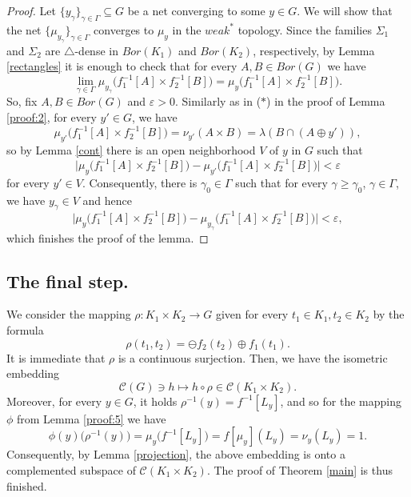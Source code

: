 \documentclass[12pt,fleqn]{amsart}
\numberwithin{equation}{section}
\theoremstyle{definition}
\def\B{\mathcal B}
\def\C{\mathcal C}
\def\ep{\varepsilon}
\newcommand{\cE}{\mathcal E}
\begin{document}
\begin{proof}
Let $\{y_\gamma\}_{\gamma\in\Gamma}\subseteq G$ be a net converging to some $y\in G$. We will show that the net $\{\mu_{y_\gamma}\}_{\gamma\in\Gamma}$ converges to $\mu_y$ in the $weak^\ast$ topology. Since the families $\Sigma_1$ and $\Sigma_2$ are $\bigtriangleup$-dense in $Bor(K_1)$ and $Bor(K_2)$, respectively, by Lemma \ref{rectangles} it is enough to check that for every $A,B\in Bor(G)$ we have
\[\lim_{\gamma\in\Gamma}\mu_{y_\gamma}\big(f_1^{-1}[A]\times f_2^{-1}[B]\big)=\mu_y\big(f_1^{-1}[A]\times f_2^{-1}[B]\big).\]
So, fix $A,B\in Bor(G)$ and $\ep>0$. Similarly as in ($*$) in the proof of Lemma \ref{proof:2}, for every $y'\in G$, we have
\[ \mu_{y'}\big(f_1^{-1}[A]\times f_2^{-1}[B]\big)=\nu_{y'}(A\times B)=\lambda(B\cap(A\oplus y')),\]
so by Lemma \ref{cont} there is an open neighborhood $V$ of $y$ in $G$ such that
\[\big|\mu_{y}\big(f_1^{-1}[A]\times f_2^{-1}[B]\big)-\mu_{y'}\big(f_1^{-1}[A]\times f_2^{-1}[B]\big)\big|<\ep\]
for every $y'\in V$. Consequently, there is $\gamma_0\in\Gamma$ such that for every $\gamma\ge\gamma_0$, $\gamma\in\Gamma$, we have $y_\gamma\in V$  and hence
\[\big|\mu_{y}\big(f_1^{-1}[A]\times f_2^{-1}[B]\big)-\mu_{y_\gamma}\big(f_1^{-1}[A]\times f_2^{-1}[B]\big)\big|<\ep,\]
which finishes the proof of the lemma.
\end{proof}

\subsection{The final step.} \label{finalstep}
We consider the mapping $\rho\colon K_1\times K_2\to G$ given for every $t_1\in K_1,t_2\in K_2$ by the formula
\[\rho(t_1,t_2)=\ominus f_2(t_2)\oplus f_1(t_1).\]
It is immediate that $\rho$ is a continuous surjection.
Then, we have the isometric embedding
\[ \C(G)\ni h\mapsto h\circ \rho\in \C(K_1\times K_2).\]
Moreover, for every $y\in G$, it holds $\rho^{-1}(y)=f^{-1}[L_y]$, and so for the mapping $\phi$ from Lemma \ref{proof:5} we have
\[\phi(y)\big(\rho^{-1}(y)\big)=\mu_y\big(f^{-1}[L_y]\big)=f[\mu_y](L_y)=\nu_y(L_y)=1.\]
Consequently, by Lemma \ref{projection}, %
the above embedding is onto a complemented subspace of $\C(K_1\times K_2)$. The proof of Theorem \ref{main} is thus finished.
\end{document}
